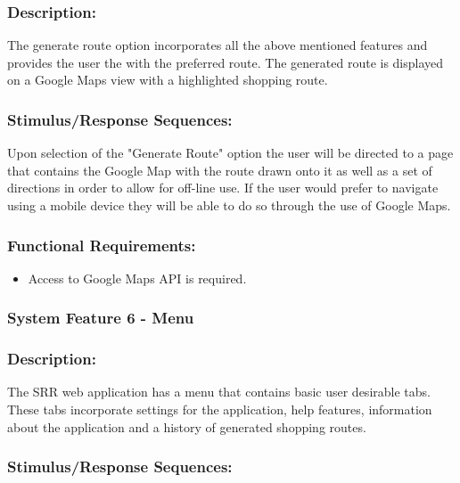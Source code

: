 \documentclass[10pt,twocolumn]{witseiepaper}
\begin{document}
		\subsubsection*{Description:}
		
		The generate route option incorporates all the above mentioned features and provides the user the with the preferred route. The generated route is displayed on a Google Maps view with a highlighted shopping route. 
		
		\subsubsection*{Stimulus/Response Sequences:}
		
		Upon selection of the "Generate Route" option the user will be directed to a page that contains the Google Map with the route drawn onto it as well as a set of directions in order to allow for off-line use. If the user would prefer to navigate using a mobile device they will be able to do so through the use of Google Maps.
		
		\subsubsection*{Functional Requirements:}
		
		\begin{itemize}
			\item Access to Google Maps API is required.
		\end{itemize}
		
		\subsubsection{System Feature 6 - Menu}
		
		\subsubsection*{Description:}
		
		The SRR web application has a menu that contains basic user desirable tabs. These tabs incorporate settings for the application, help features, information about the application and a history of generated shopping routes. 
		
		\subsubsection*{Stimulus/Response Sequences:}
		
\end{document}

